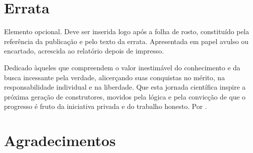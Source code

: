 \documentclass[a4paper,12pt,brazilian,oneside]{Relatorio}
\begin{document}
 
\nocite{*}


\pretextual


\folhaderosto
\contracapa
\fichacatalografica




\chapter*{Errata}
\noindent Elemento opcional. Deve ser inserida logo após a folha de rosto, constituído pela referência da publicação e pelo texto da errata. Apresentada em papel avulso ou encartado, acrescida ao relatório depois de impresso.\\[1em]




\folhadeaprovacao{\today}




\begin{dedicatoria}
    Dedicado àqueles que compreendem o valor
    inestimável do conhecimento e da busca incessante
    pela verdade, alicerçando suas conquistas no mérito,
    na responsabilidade individual e na liberdade.
    Que esta jornada científica inspire a próxima
    geração de construtores, movidos pela lógica
    e pela convicção de que o progresso 
    é fruto da iniciativa privada e do 
    trabalho honesto. Por \WenesTex.
\end{dedicatoria}




\chapter*{Agradecimentos}
\emph{\WenesTex} \lipsum[101]
\end{document}
